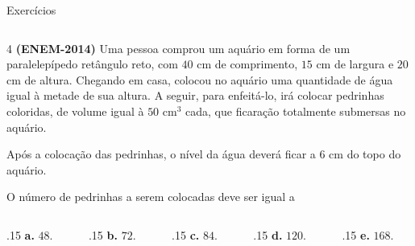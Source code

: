 \documentclass[aspectratio=169, t, 8pt]{beamer}
\begin{document}
    \begin{frame} {Exercícios} %
        \begin{columns}[totalwidth=.9\textwidth]
            \begin{column}{\textwidth}
                4 \textbf{(ENEM-2014) }Uma pessoa comprou um aquário em forma de um paralelepípedo retângulo reto, com $40$ cm de comprimento, $15$ cm de largura e $20$ cm de altura. Chegando em casa, colocou no aquário uma quantidade de água igual à metade de sua altura. A seguir, para enfeitá-lo, irá colocar pedrinhas coloridas, de volume igual à $50 \text{ cm}^3$ cada, que ficaração totalmente submersas no aquário.
                
                \vspace{1em}

                Após a colocação das pedrinhas, o nível da água deverá ficar a $6$ cm do topo do aquário.

                \vspace{1em}

                O número de pedrinhas a serem colocadas deve ser igual a
            \end{column}   
        \end{columns}
            \vspace{1.8em}

        \begin{center}
            \begin{columns}
                \begin{column}{.15\textwidth}
                    \centering
                    \textbf{a. } $48.$
                \end{column}
                \begin{column}{.15\textwidth}
                    \centering
                    \textbf{b. } $72.$
                \end{column}
                \begin{column}{.15\textwidth}
                    \centering
                    \textbf{c. } $84.$
                \end{column}
                \begin{column}{.15\textwidth}
                    \centering
                    \textbf{d. } $120.$
                \end{column}
                \begin{column}{.15\textwidth}
                    \centering
                    \textbf{e. } $168.$
                \end{column}
            \end{columns}
        \end{center}
    \end{frame}
\end{document}
